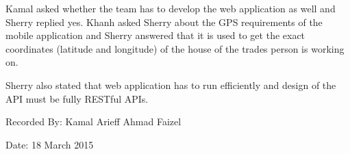 \documentclass[12pt]{article}
\begin{document}
\begin{flushleft}
Kamal asked whether the team has to develop the web application as well and Sherry replied yes. Khanh asked Sherry about the GPS requirements of the mobile application and Sherry answered that it is used to get the exact coordinates (latitude and longitude) of the house of the trades person is working on.
\end{flushleft}

\begin{flushleft}
Sherry also stated that web application has to run efficiently and design of the API must be fully RESTful APIs.
\end{flushleft}
 
\vspace{1cm}
\noindent\begin{minipage}{0.5\linewidth}
\begin{flushleft}
Recorded By: Kamal Arieff Ahmad Faizel
\end{flushleft}
\end{minipage}
\hfill
\begin{minipage}{0.45\linewidth}
\begin{flushright}
Date: 18 March 2015
\end{flushright}


\end{minipage}
\end{document}
